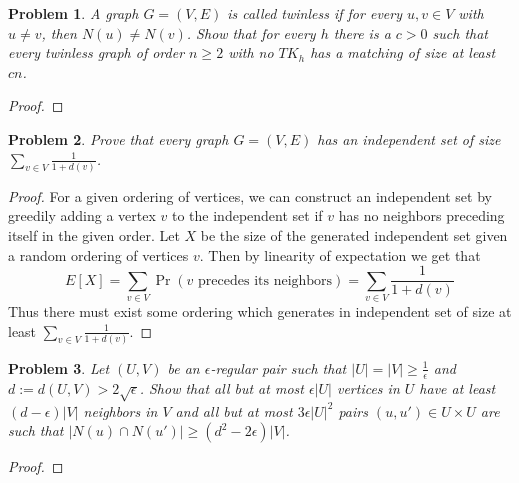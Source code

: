 \documentclass[12pt]{article}
\newtheorem{problem}{Problem}
\begin{document}
\begin{problem} A graph $G=(V,E)$ is called twinless if for every
  $u,v \in V$ with $u \neq v$, then $N(u) \neq N(v)$. Show that for
  every $h$ there is a $c > 0$ such that every twinless graph of order
  $n \geq 2$ with no $TK_h$ has a matching of size at least $cn$.
\end{problem}
\begin{proof}
\end{proof}

\begin{problem} Prove that every graph $G=(V,E)$ has an independent
  set of size $\sum_{v \in V} \frac{1}{1 + d(v)}$.
\end{problem}
\begin{proof} For a given ordering of vertices, we can construct an
  independent set by greedily adding a vertex $v$ to the independent
  set if $v$ has no neighbors preceding itself in the given order. Let
  $X$ be the size of the generated independent set given a random
  ordering of vertices $v$. Then by linearity of expectation we get
  that
  \[
    E[X] = \sum_{v \in V} \Pr(v \text{ precedes its neighbors}) =
    \sum_{v \in V} \frac{1}{1 + d(v)}
  \]
  Thus there must exist some ordering which generates in independent
  set of size at least $\sum_{v \in V} \frac{1}{1 + d(v)}$.
\end{proof}

\begin{problem} Let $(U,V)$ be an $\epsilon$-regular pair such that
  $|U| = |V| \geq \frac{1}{\epsilon}$ and
  $d:= d(U,V) > 2 \sqrt{\epsilon}$. Show that all but at most
  $\epsilon|U|$ vertices in $U$ have at least $(d - \epsilon )|V|$
  neighbors in $V$ and all but at most $3\epsilon |U|^2$ pairs
  $(u, u') \in U \times U$ are such that
  $|N(u) \cap N(u')| \geq (d^2 - 2\epsilon)|V|$.
\end{problem}
\begin{proof}
\end{proof}
\end{document}
